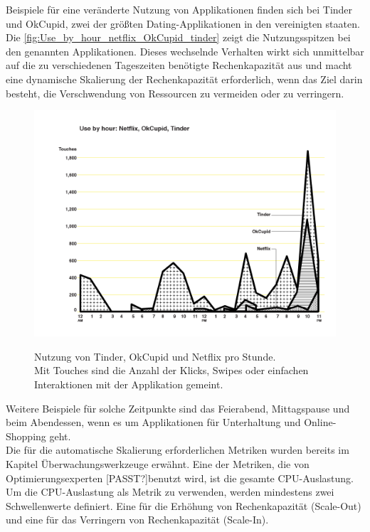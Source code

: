 Beispiele für eine veränderte Nutzung von Applikationen finden sich bei Tinder und OkCupid, zwei der größten Dating-Applikationen in den vereinigten staaten. Die \autoref{fig:Use_by_hour_netflix_OkCupid_tinder} zeigt die Nutzungsspitzen bei den genannten Applikationen. Dieses wechselnde Verhalten wirkt sich unmittelbar auf die zu verschiedenen Tageszeiten benötigte Rechenkapazität aus und macht eine dynamische Skalierung der Rechenkapazität erforderlich, wenn das Ziel darin besteht, die Verschwendung von Ressourcen zu vermeiden oder zu verringern. 
\begin{figure}[h!]
  \centering
  \includegraphics[scale=0.33]{sources/Use_by_hour_netflix_OkCupid_tinder}
  \caption[Nutzung von Tinder, OkCupid und Netflix pro Stunde]{}\label{fig:Use_by_hour_netflix_OkCupid_tinder} Nutzung von Tinder, OkCupid und Netflix pro Stunde.  
  {\cite{SCOUT1}}
  \\Mit Touches sind die Anzahl der Klicks, Swipes oder einfachen Interaktionen mit der Applikation gemeint.
\end{figure}

Weitere Beispiele für solche Zeitpunkte sind das Feierabend, Mittagspause und beim Abendessen, wenn es um Applikationen für Unterhaltung und Online-Shopping geht.
\\
Die für die automatische Skalierung erforderlichen Metriken wurden bereits im Kapitel Überwachungswerkzeuge erwähnt. Eine der Metriken, die von Optimierungsexperten [PASST?]benutzt wird, ist die gesamte CPU-Auslastung. 
Um die CPU-Auslastung als Metrik zu verwenden, werden mindestens zwei Schwellenwerte definiert. Eine für die Erhöhung von Rechenkapazität (Scale-Out) und eine für das Verringern von Rechenkapazität (Scale-In).


